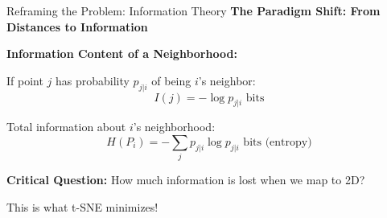 \documentclass[10pt]{beamer}
\newcommand{\emphtext}[1]{\textcolor{upcblue}{\textbf{#1}}}
\newcommand{\warningbox}[1]{\colorbox{red!10}{\begin{minipage}{0.85\textwidth}\centering #1\end{minipage}}}
\begin{document}
\begin{frame}{Reframing the Problem: Information Theory}
\emphtext{The Paradigm Shift: From Distances to Information}

\vspace{0.3cm}
\begin{center}
\end{center}

\vspace{0.3cm}
\emphtext{Information Content of a Neighborhood:}

If point $j$ has probability $p_{j|i}$ of being $i$'s neighbor:
$$I(j) = -\log p_{j|i} \text{ bits}$$

Total information about $i$'s neighborhood:
$$H(P_i) = -\sum_j p_{j|i} \log p_{j|i} \text{ bits (entropy)}$$

\vspace{0.2cm}
\begin{center}
\warningbox{\footnotesize\textbf{Critical Question:} How much information is lost when we map to 2D?}
\end{center}

This is what t-SNE minimizes!
\end{frame}
\end{document}
